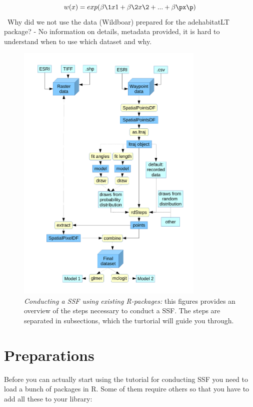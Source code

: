 \documentclass[11pt, a4paper]{article}\usepackage[]{graphicx}\usepackage[]{color}
\begin{document}
\[
\displaystyle w(x) = exp(\beta\1 x1 + \beta\2 x\2 + ... + \beta\px\p)
\]
\
Why did we not use the data (Wildboar) prepared for the adehabitatLT package? - No information on details, metadata provided, it is hard to understand when to use which dataset and why.


\begin{figure} %
\captionsetup{width=0.8\textwidth}
\centering
\includegraphics[width=0.8\textwidth]{Flowchart.pdf} %
\caption{\emph{Conducting a SSF using existing R-packages:} this figures provides an overview of the steps necessary to conduct a SSF. The steps are separated in subsections, which the turtorial will guide you through.}
\label{fig:Flowchart}
\end{figure}




\section{Preparations}
Before you can actually start using the tutorial for conducting SSF you need to load a bunch of packages in R. Some of them require others so that you have to add all these to your library:
\end{document}
